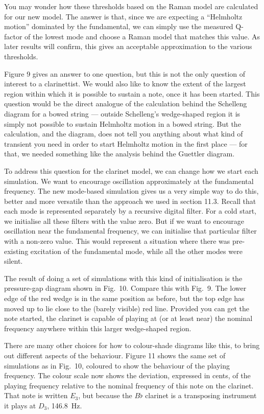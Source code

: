   You may wonder how these thresholds based on the Raman model are calculated 
  for our new model. The answer is that, since we are expecting a “Helmholtz 
  motion” dominated by the fundamental, we can simply use the measured Q-factor 
  of the lowest mode and choose a Raman model that matches this value. As later 
  results will confirm, this gives an acceptable approximation to the various 
  thresholds. 

  Figure 9 gives an answer to one question, but this is not the only question 
  of interest to a clarinettist. We would also like to know the extent of the 
  largest region within which it is possible to sustain a note, once it has 
  been started. This question would be the direct analogue of the calculation 
  behind the Schelleng diagram for a bowed string — outside Schelleng’s 
  wedge-shaped region it is simply not possible to sustain Helmholtz motion in 
  a bowed string. But the calculation, and the diagram, does not tell you 
  anything about what kind of transient you need in order to start Helmholtz 
  motion in the first place — for that, we needed something like the analysis 
  behind the Guettler diagram. 

  To address this question for the clarinet model, we can change how we start 
  each simulation. We want to encourage oscillation approximately at the 
  fundamental frequency. The new mode-based simulation gives us a very simple 
  way to do this, better and more versatile than the approach we used in 
  section 11.3. Recall that each mode is represented separately by a recursive 
  digital filter. For a cold start, we initialise all these filters with the 
  value zero. But if we want to encourage oscillation near the fundamental 
  frequency, we can initialise that particular filter with a non-zero value. 
  This would represent a situation where there was pre-existing excitation of 
  the fundamental mode, while all the other modes were silent. 

  The result of doing a set of simulations with this kind of initialisation is 
  the pressure-gap diagram shown in Fig.\ 10. Compare this with Fig.\ 9. The 
  lower edge of the red wedge is in the same position as before, but the top 
  edge has moved up to lie close to the (barely visible) red line. Provided you 
  can get the note started, the clarinet is capable of playing at (or at least 
  near) the nominal frequency anywhere within this larger wedge-shaped region. 

  There are many other choices for how to colour-shade diagrams like this, to 
  bring out different aspects of the behaviour. Figure 11 shows the same set of 
  simulations as in Fig.\ 10, coloured to show the behaviour of the playing 
  frequency. The colour scale now shows the deviation, expressed in cents, of 
  the playing frequency relative to the nominal frequency of this note on the 
  clarinet. That note is written $E_3$, but because the $B\flat$ clarinet is a 
  transposing instrument it plays at $D_3$, 146.8~Hz. 


